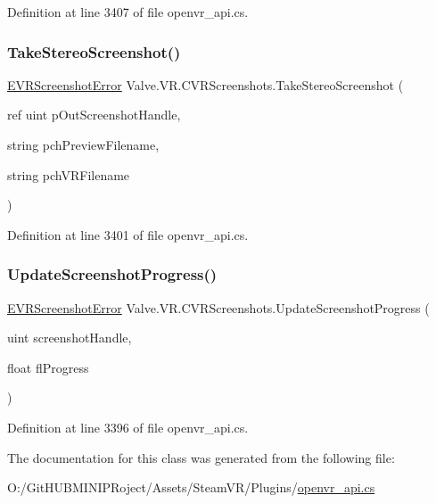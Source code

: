 Definition at line 3407 of file openvr\+\_\+api.\+cs.

\mbox{\label{class_valve_1_1_v_r_1_1_c_v_r_screenshots_a704fb95aa209fa60fd688c583b9b7d89}} 
\subsubsection{\texorpdfstring{TakeStereoScreenshot()}{TakeStereoScreenshot()}}
{\footnotesize\ttfamily \mbox{\hyperlink{namespace_valve_1_1_v_r_ac73c6dcb1af8fe045a626296a21e226b}{E\+V\+R\+Screenshot\+Error}} Valve.\+V\+R.\+C\+V\+R\+Screenshots.\+Take\+Stereo\+Screenshot (\begin{DoxyParamCaption}\item[{ref uint}]{p\+Out\+Screenshot\+Handle,  }\item[{string}]{pch\+Preview\+Filename,  }\item[{string}]{pch\+V\+R\+Filename }\end{DoxyParamCaption})}



Definition at line 3401 of file openvr\+\_\+api.\+cs.

\mbox{\label{class_valve_1_1_v_r_1_1_c_v_r_screenshots_a68d2c2b6d193819be408757bfe8cf638}} 
\subsubsection{\texorpdfstring{UpdateScreenshotProgress()}{UpdateScreenshotProgress()}}
{\footnotesize\ttfamily \mbox{\hyperlink{namespace_valve_1_1_v_r_ac73c6dcb1af8fe045a626296a21e226b}{E\+V\+R\+Screenshot\+Error}} Valve.\+V\+R.\+C\+V\+R\+Screenshots.\+Update\+Screenshot\+Progress (\begin{DoxyParamCaption}\item[{uint}]{screenshot\+Handle,  }\item[{float}]{fl\+Progress }\end{DoxyParamCaption})}



Definition at line 3396 of file openvr\+\_\+api.\+cs.



The documentation for this class was generated from the following file\+:\begin{DoxyCompactItemize}
\item 
O\+:/\+Git\+H\+U\+B\+M\+I\+N\+I\+P\+Roject/\+Assets/\+Steam\+V\+R/\+Plugins/\mbox{\hyperlink{openvr__api_8cs}{openvr\+\_\+api.\+cs}}\end{DoxyCompactItemize}
